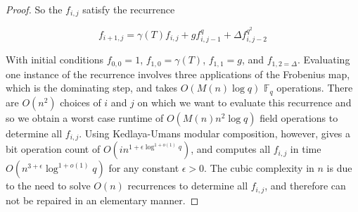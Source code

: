 \documentclass{jams-l}
\theoremstyle{remark}
\numberwithin{equation}{section}
\begin{document}
\begin{proof}
\noindent So the $f_{i,j}$ satisfy the recurrence

\[ f_{i+1,j} = \gamma(T) f_{i,j} + g f_{i,j-1}^q + \Delta f_{i,j-2}^{q^2}\]


\noindent With initial conditions $f_{0,0} = 1$, $f_{1,0} = \gamma(T)$, $f_{1,1} = g$, and $f_{1,2 = \Delta}$. Evaluating one instance of the recurrence involves three applications of the Frobenius map, which is the dominating step, and takes $O(M(n) \log q)$ $\mathbb{F}_q$ operations. There are $O(n^2)$ choices of $i$ and $j$ on which we want to evaluate this recurrence and so we obtain a worst case runtime of $O(M(n)n^2\log q)$ field operations to determine all $f_{i,j}$. Using Kedlaya-Umans modular composition, however, gives a bit operation count of $O(i n^{1 + \epsilon \log^{1 + o(1)} q})$, and computes all $f_{i,j}$ in time $O(n^{3 + \epsilon} \log^{1 + o(1)} q)$ for any constant $\epsilon > 0$. The cubic complexity in $n$ is due to the need to solve $O(n)$ recurrences to determine all $f_{i,j}$, and therefore can not be repaired in an elementary manner. 

\end{proof}
\end{document}
